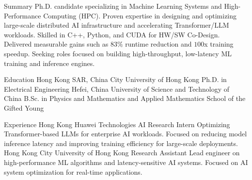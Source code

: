 \documentclass[caps, english]{financecv}
\begin{document}
\begin{cvsection}{Summary}
    Ph.D. candidate specializing in Machine Learning Systems and High-Performance Computing (HPC). Proven expertise in designing and optimizing large-scale distributed AI infrastructure and accelerating Transformer/LLM workloads. Skilled in C++, Python, and CUDA for HW/SW Co-Design. Delivered measurable gains such as $83\%$ runtime reduction and $100$x training speedup. Seeking roles focused on building high-throughput, low-latency ML training and inference engines.
\end{cvsection}

\begin{cvsection}{Education}
    {Hong Kong SAR, China}
    {City University of Hong Kong}
    {}
    {Ph.D. in Electrical Engineering}
    {}
    {}
    {}
    {Hefei, China}
    {University of Science and Technology of China}
    {}
    {B.Sc. in Physics and Mathematics and Applied Mathematics}
    {School of the Gifted Young}
    {}
    {}
\end{cvsection}

\begin{cvsection}{Experience}
    {Hong Kong}
    {Huawei Technologies}
    {AI Research Intern}
    {Optimizing Transformer-based LLMs for enterprise AI workloads. Focused on reducing model inference latency and improving training efficiency for large-scale deployments.}
    {}
    {}
    {}
    {Hong Kong}
    {City University of Hong Kong}
    {Research Assistant}
    {Lead engineer on high-performance ML algorithms and latency-sensitive AI systems. Focused on AI system optimization for real-time applications.}
    {}
    {}
    {}
\end{cvsection}
\end{document}
